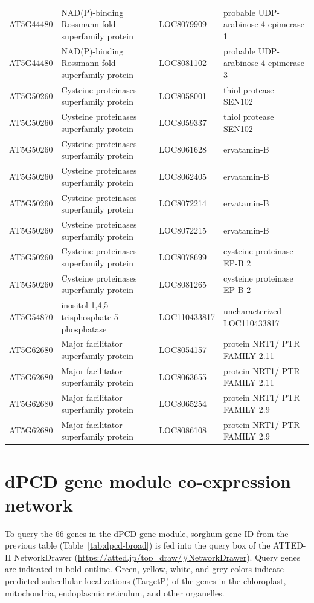 \begin{longtable}{l p{5.5cm} l p{4.5cm}}
        AT5G44480 & NAD(P)-binding Rossmann-fold superfamily protein & LOC8079909 & probable UDP-arabinose 4-epimerase 1 \\
        AT5G44480 & NAD(P)-binding Rossmann-fold superfamily protein & LOC8081102 & probable UDP-arabinose 4-epimerase 3 \\
        AT5G50260 & Cysteine proteinases superfamily protein & LOC8058001 & thiol protease SEN102 \\
        AT5G50260 & Cysteine proteinases superfamily protein & LOC8059337 & thiol protease SEN102 \\
        AT5G50260 & Cysteine proteinases superfamily protein & LOC8061628 & ervatamin-B \\
        AT5G50260 & Cysteine proteinases superfamily protein & LOC8062405 & ervatamin-B \\
        AT5G50260 & Cysteine proteinases superfamily protein & LOC8072214 & ervatamin-B \\
        AT5G50260 & Cysteine proteinases superfamily protein & LOC8072215 & ervatamin-B \\
        AT5G50260 & Cysteine proteinases superfamily protein & LOC8078699 & cysteine proteinase EP-B 2 \\
        AT5G50260 & Cysteine proteinases superfamily protein & LOC8081265 & cysteine proteinase EP-B 2 \\
        AT5G54870 & inositol-1,4,5-trisphosphate 5-phosphatase & LOC110433817 & uncharacterized LOC110433817 \\
        AT5G62680 & Major facilitator superfamily protein & LOC8054157 & protein NRT1/ PTR FAMILY 2.11 \\
        AT5G62680 & Major facilitator superfamily protein & LOC8063655 & protein NRT1/ PTR FAMILY 2.11 \\
        AT5G62680 & Major facilitator superfamily protein & LOC8065254 & protein NRT1/ PTR FAMILY 2.9 \\
        AT5G62680 & Major facilitator superfamily protein & LOC8086108 & protein NRT1/ PTR FAMILY 2.9 \\
\end{longtable}

\clearpage
\section{dPCD gene module co-expression network}
\hspace{1em}To query the 66 genes in the dPCD gene module, sorghum gene ID from the previous table (Table~\ref{tab:dpcd-broad}) is fed into the query box of the ATTED-II NetworkDrawer (\url{https://atted.jp/top_draw/#NetworkDrawer}). Query genes are indicated in bold outline. Green, yellow, white, and grey colors indicate predicted subcellular localizations (TargetP) of the genes in the chloroplast, mitochondria, endoplasmic reticulum, and other organelles.

